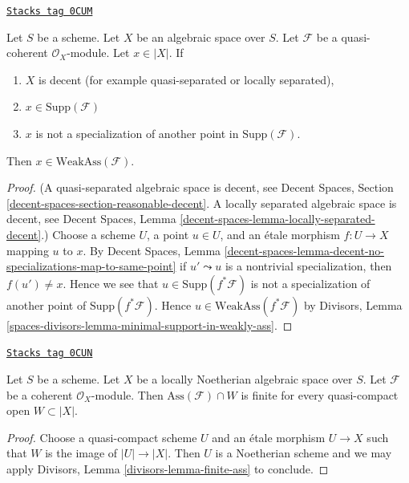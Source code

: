 \begin{lemma}
\label{spaces-divisors-lemma-minimal-support-in-weakly-ass-decent}
\href{https://stacks.math.columbia.edu/tag/0CUM}{\texttt{Stacks tag 0CUM}}

Let $S$ be a scheme. Let $X$ be an algebraic space over $S$.
Let $\mathcal{F}$ be a quasi-coherent $\mathcal{O}_X$-module.
Let $x \in |X|$. If
\begin{enumerate}
\item $X$ is decent (for example quasi-separated or locally separated),
\item $x \in \text{Supp}(\mathcal{F})$
\item $x$ is not a specialization of another point in
$\text{Supp}(\mathcal{F})$.
\end{enumerate}
Then $x \in \text{WeakAss}(\mathcal{F})$.
\end{lemma}

\begin{proof}
(A quasi-separated algebraic space is decent, see
Decent Spaces, Section \ref{decent-spaces-section-reasonable-decent}.
A locally separated algebraic space is decent, see
Decent Spaces, Lemma \ref{decent-spaces-lemma-locally-separated-decent}.)
Choose a scheme $U$, a point $u \in U$, and an \'etale morphism
$f : U \to X$ mapping $u$ to $x$. By
Decent Spaces, Lemma
\ref{decent-spaces-lemma-decent-no-specializations-map-to-same-point}
if $u' \leadsto u$ is a nontrivial specialization, then
$f(u') \not = x$. Hence we see that $u \in \text{Supp}(f^*\mathcal{F})$
is not a specialization of another point of
$\text{Supp}(f^*\mathcal{F})$.
Hence $u \in \text{WeakAss}(f^*\mathcal{F})$ by
Divisors, Lemma \ref{spaces-divisors-lemma-minimal-support-in-weakly-ass}.
\end{proof}

\begin{lemma}
\label{spaces-divisors-lemma-finite-ass}
\href{https://stacks.math.columbia.edu/tag/0CUN}{\texttt{Stacks tag 0CUN}}

Let $S$ be a scheme. Let $X$ be a locally Noetherian algebraic space over $S$.
Let $\mathcal{F}$ be a coherent $\mathcal{O}_X$-module.
Then $\text{Ass}(\mathcal{F}) \cap W$ is finite for
every quasi-compact open $W \subset |X|$.
\end{lemma}

\begin{proof}
Choose a quasi-compact scheme $U$ and an \'etale morphism $U \to X$
such that $W$ is the image of $|U| \to |X|$. Then $U$ is a
Noetherian scheme and we may apply
Divisors, Lemma \ref{divisors-lemma-finite-ass} to conclude.
\end{proof}

